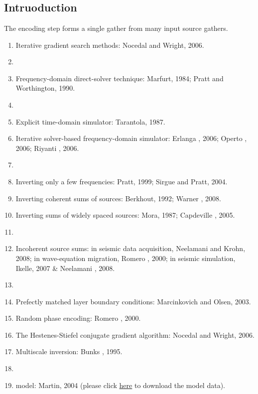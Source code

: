 \renewcommand{\pmk}{Krebs\_2009\_Geophy\_FFW using encoded sources}
\renewcommand{\prf}{FWI/\pmk.pdf}
\renewcommand{\pti}{Fast full-wavefield seismic inversion
using encoded sources}
\renewcommand{\pay}{Jerome R. Krebs, John E. Anderson, David Hinkley
\etal, 2009}
\renewcommand{\pjo}{Geophysics}
\renewcommand{\pda}{2019/3/28 Thu.}

\section{\pinfo}

\subsection{Intruoduction}
The encoding step forms a single gather from many input source gathers.

\begin{enumerate}[\hspace{10mm}*]
  \item Iterative gradient search methods: Nocedal and Wright, 2006.
  \item \sline
  \item Frequency-domain direct-solver technique: Marfurt, 1984;
    Pratt and Worthington, 1990.
  \item \sline
  \item Explicit time-domain simulator: Tarantola, 1987.
  \item Iterative solver-based frequency-domain simulator: Erlanga \etal, 2006;
    Operto \etal, 2006; Riyanti \etal, 2006.
  \item \sline
  \item Inverting only a few frequencies: Pratt, 1999; Sirgue and Pratt, 2004.
  \item Inverting coherent sums of sources: Berkhout, 1992; Warner \etal, 2008.
  \item Inverting sums of widely spaced sources: Mora, 1987;
    Capdeville \etal, 2005.
  \item \sline
  \item Incoherent source sums:
    in seismic data acquisition, Neelamani and Krohn, 2008;
    in wave-equation migration, Romero \etal, 2000;
    in seismic simulation, Ikelle, 2007 \& Neelamani \etal, 2008.
  \item \sline
  \item Prefectly matched layer boundary conditions:
    Marcinkovich and Olsen, 2003.
  \item Random phase encoding: Romero \etal, 2000.
  \item The Hestenes-Stiefel conjugate gradient algorithm:
    Nocedal and Wright, 2006.
  \item Multiscale inversion: Bunks \etal, 1995.
  \item \sline
  \item {} model:
    Martin, 2004 (please click \href{http://www.agl.uh.edu/downloads/downloads.htm}{here}
    to download the model data).
\end{enumerate}

